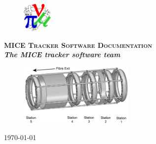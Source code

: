 
\begin{figure}[h]
  \begin{flushright}
      \includegraphics[width=0.13\textwidth]{logos/MICE.eps}
  \end{flushright}
\end{figure}

\vspace{1.5cm}

\begin{center}
  {\bf\LARGE 
    \textsc{MICE Tracker Software Documentation}                      \\
  }
  \vspace{0.75cm}
  {\bf\it\Large The MICE tracker software team} \\
  \vspace{2cm}
\end{center}

\begin{figure}[h]
    \includegraphics[width=0.5\textwidth]
      {00a-Title-page/Figures/Tracker-sw-logo.eps}
\end{figure}

\begin{center}
  \vspace{1.5cm}
  \today{}
\end{center}



\vfill
